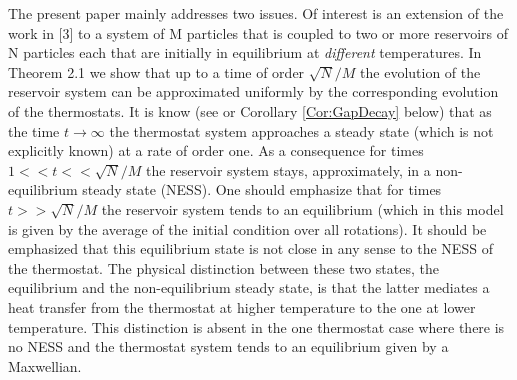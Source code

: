 \documentclass{article}
\def\mnote#1{\marginnote{\small{\red{#1}}}}
\def\red{}
\begin{document}
\red{The present paper mainly addresses two issues. Of interest is an extension of the work in [3] to a system of M 
particles
that is coupled to two or more reservoirs of N particles each that are initially in equilibrium at {\it different}
temperatures. In Theorem 2.1 we show that up to a time of order $\sqrt N/M$ the evolution of the reservoir system can be
approximated uniformly by the corresponding evolution of the thermostats. It is know (see \cite{CLM,Evans} or Corollary
\ref{Cor:GapDecay} below) that as the time $t \to \infty$ the thermostat system approaches a steady state (which is not
explicitly known) at a rate of order one. As a consequence for times $1<< t << \sqrt N/M$ the reservoir system stays,
approximately, in a non-equilibrium steady state (NESS). One should emphasize that for times $t>> \sqrt N/M$ the
reservoir system tends to an equilibrium (which in this model is given by the average of the initial condition over all
rotations). It should be emphasized that this equilibrium state is not close in any sense to the NESS of the thermostat.
 The physical distinction between these two states, the equilibrium and the non-equilibrium steady state, is that the
latter mediates a heat transfer from the thermostat at higher temperature to the one at lower temperature. This
distinction is absent in the one thermostat case where there is no NESS and the thermostat system tends to an
equilibrium given by a Maxwellian.}

\end{document}
